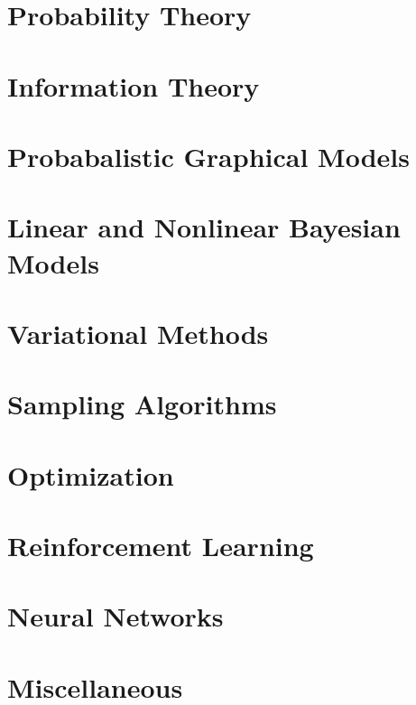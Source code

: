 \documentclass[12pt]{article}
\begin{document}

\maketitle

\tableofcontents

\newpage

\section{Probability Theory}

\section{Information Theory}

\section{Probabalistic Graphical Models}

\section{Linear and Nonlinear Bayesian Models}

\section{Variational Methods}

\section{Sampling Algorithms}

\section{Optimization}

\section{Reinforcement Learning}

\section{Neural Networks}

\section{Miscellaneous}
\end{document}
